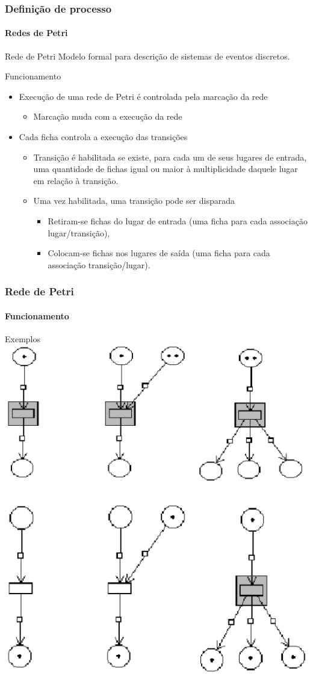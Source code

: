 \begin{frame}
	\frametitle{Definição de processo}
	\framesubtitle{Redes de Petri}
	
	\begin{block:concept}{Rede de Petri}
		Modelo formal para descrição de sistemas de eventos discretos.
	\end{block:concept}
	
	\begin{block:concept}{Funcionamento}
	\begin{itemize}
		\item Execução de uma rede de Petri é controlada pela marcação da rede
		\begin{itemize}
			\item Marcação muda com a execução da rede
		\end{itemize}
		
		\item Cada ficha controla a execução das transições
		\begin{itemize}
			\item Transição é habilitada se existe, para cada um de seus lugares de
			entrada, uma quantidade de fichas igual ou maior à multiplicidade daquele
			lugar em relação à transição.
			
			\item Uma vez habilitada, uma transição pode ser disparada
			\begin{itemize}
				\item Retiram-se fichas do lugar de entrada (uma ficha para cada
				associação lugar/transição),
				\item Colocam-se fichas nos lugares de saída (uma ficha para cada
				associação transição/lugar).
			\end{itemize}
		\end{itemize}
	\end{itemize}
\end{block:concept}
\end{frame}

\begin{frame}
	\frametitle{Rede de Petri}
	\framesubtitle{Funcionamento}
	
	\begin{block:ie}{Exemplos}
		\centering
		\includegraphics[width=.5\textwidth]{software-engineering/petri-net/petrinet-execution-examples-v2}
	\end{block:ie}
\end{frame}


